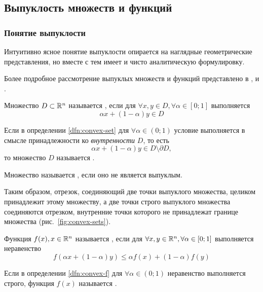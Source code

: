 
\subsection{Выпуклость множеств и функций}

\subsubsection{Понятие выпуклости}
\label{sec:convexity}
Интуитивно ясное понятие выпуклости опирается на наглядные
геометрические представления, но вместе с тем имеет и чисто
аналитическую формулировку.

Более подробное рассмотрение выпуклых множеств и функций представлено
в \cite{fikhtengolz03}, \cite{kolmogorov72} и \cite{polovinkin04}.

\begin{dfn}
  \label{dfn:convex-set}
  Множество $D \subset \mathbb{R}^n$ называется , если
  для $\forall x, y \in D, \forall \alpha \in [0;1]$ выполняется
  \begin{equation*}
    \alpha x + (1-\alpha) y \in D
  \end{equation*}
\end{dfn}
\begin{dfn}
  Если в определении \ref{dfn:convex-set} для $\forall \alpha \in
  (0;1)$ условие выполняется в смысле принадлежности ко
  \emph{внутренности} $D$, то есть
  \begin{equation*}
    \alpha x + (1-\alpha) y \in D \setminus \partial D,
  \end{equation*}
  то множество $D$ называется .
\end{dfn}
\begin{dfn}
  Множество называется , если оно не является
  выпуклым.
\end{dfn}
Таким образом, отрезок, соединяющий две точки выпуклого множества,
целиком принадлежит этому множеству, а две точки строго выпуклого
множества соединяются отрезком, внутренние точки которого не
принадлежат границе множества (рис. \ref{fig:convex-sets}).



\begin{dfn}
  \label{dfn:convex-f}
  Функция $f(x), x \in \mathbb{R}^n$ называется , если
  для $\forall x, y \in \mathbb{R}^n, \forall \alpha \in [0;1]$
  выполняется неравенство
  \begin{equation*}
    f(\alpha x + (1-\alpha)y) \leq \alpha f(x) + (1-\alpha) f(y)
  \end{equation*}
\end{dfn}
\begin{dfn}
  \label{dfn:strictly-convex-f}
  Если в определении \ref{dfn:convex-f} для $\forall \alpha \in (0;1)$
  неравенство выполняется строго, функция $f(x)$ называется
  .
\end{dfn}


